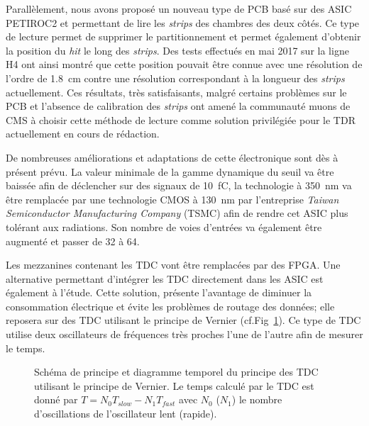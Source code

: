 Parallèlement, nous avons proposé un nouveau type de PCB basé sur des ASIC PETIROC2 et permettant de lire les \textit{strips} des chambres des deux côtés. Ce type de lecture permet de supprimer le partitionnement et permet également d'obtenir la position du \textit{hit} le long des \textit{strips}. Des tests effectués en mai \num{2017} sur la ligne H4 ont ainsi montré que cette position pouvait être connue avec une résolution de l'ordre de \SI{1.8}{\centi\meter} contre une résolution correspondant à la longueur des \textit{strips} actuellement. Ces résultats, très satisfaisants, malgré certains problèmes sur le PCB et l'absence de calibration des \textit{strips} ont amené la communauté muons de CMS à choisir cette méthode de lecture comme solution privilégiée pour le TDR actuellement en cours de rédaction.

De nombreuses améliorations et adaptations de cette électronique sont dès à présent prévu. La valeur minimale de la gamme dynamique du seuil va être baissée afin de déclencher sur des signaux de \SI{10}{\femto\coulomb}, la technologie  à \SI{350}{\nano\meter} va être remplacée par une technologie CMOS à \SI{130}{\nano\meter} par l'entreprise \textit{Taiwan Semiconductor Manufacturing Company} (TSMC) afin de rendre cet ASIC plus tolérant aux radiations. Son nombre de voies d'entrées va également être augmenté et passer de \num{32} à \num{64}.

Les mezzanines contenant les TDC vont être remplacées par des FPGA. Une alternative permettant d'intégrer les TDC directement dans les ASIC est également à l'étude. Cette solution, présente l'avantage de diminuer la consommation électrique et évite les problèmes de routage des données; elle reposera sur des TDC utilisant le principe de Vernier (cf.Fig~\ref{vernier}). Ce type de TDC utilise deux oscillateurs de fréquences très proches l'une de l'autre afin de mesurer le temps.

\begin{figure}[ht!]
	\centering
	\hfill
	\caption{Schéma de principe et diagramme temporel du principe des TDC utilisant le principe de Vernier. Le temps calculé par le TDC est donné par $T=N_0T_{slow}-N_1T_{fast}$ avec $N_0$ ($N_1$) le nombre d'oscillations de l'oscillateur lent (rapide).}
	\label{vernier}
\end{figure}

